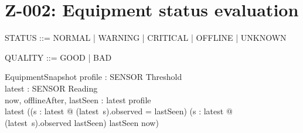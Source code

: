 \documentclass{article}
\begin{document}
\section*{Z-002: Equipment status evaluation}

\begin{zed}
  [SENSOR]
\end{zed}

\begin{zed}
  STATUS ::= NORMAL | WARNING | CRITICAL | OFFLINE | UNKNOWN
\end{zed}

\begin{zed}
  QUALITY ::= GOOD | BAD
\end{zed}



\begin{schema}{EquipmentSnapshot}
  profile : SENSOR \pfun Threshold \\
  latest : SENSOR \pfun Reading \\
  now, offlineAfter, lastSeen : \nat
\where
  \dom latest \subseteq \dom profile \\
  \dom latest \neq \emptyset \implies
    ((\exists s : \dom latest @ (latest~s).observed = lastSeen)
    \land (\forall s : \dom latest @ (latest~s).observed \leq lastSeen)
    \land lastSeen \leq now)
\end{schema}
\end{document}
